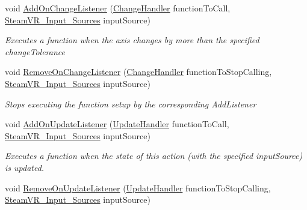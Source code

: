 \begin{DoxyCompactItemize}
void \mbox{\hyperlink{class_valve_1_1_v_r_1_1_steam_v_r___action___vector3_a1a205d38a16267d83ec0e3dcbffa46d7}{Add\+On\+Change\+Listener}} (\mbox{\hyperlink{class_valve_1_1_v_r_1_1_steam_v_r___action___vector3_a78943f89733a1c1a8e12cb4896e65907}{Change\+Handler}} function\+To\+Call, \mbox{\hyperlink{namespace_valve_1_1_v_r_a82e5bf501cc3aa155444ee3f0662853f}{Steam\+V\+R\+\_\+\+Input\+\_\+\+Sources}} input\+Source)
\begin{DoxyCompactList}\small\item\em Executes a function when the axis changes by more than the specified change\+Tolerance \end{DoxyCompactList}\item 
void \mbox{\hyperlink{class_valve_1_1_v_r_1_1_steam_v_r___action___vector3_a2517009b114133b34c81a4713c308985}{Remove\+On\+Change\+Listener}} (\mbox{\hyperlink{class_valve_1_1_v_r_1_1_steam_v_r___action___vector3_a78943f89733a1c1a8e12cb4896e65907}{Change\+Handler}} function\+To\+Stop\+Calling, \mbox{\hyperlink{namespace_valve_1_1_v_r_a82e5bf501cc3aa155444ee3f0662853f}{Steam\+V\+R\+\_\+\+Input\+\_\+\+Sources}} input\+Source)
\begin{DoxyCompactList}\small\item\em Stops executing the function setup by the corresponding Add\+Listener \end{DoxyCompactList}\item 
void \mbox{\hyperlink{class_valve_1_1_v_r_1_1_steam_v_r___action___vector3_a05495244778aff42a6d87709c0aa0d55}{Add\+On\+Update\+Listener}} (\mbox{\hyperlink{class_valve_1_1_v_r_1_1_steam_v_r___action___vector3_a99c0524f104c6d8c94a0e874b0ecc813}{Update\+Handler}} function\+To\+Call, \mbox{\hyperlink{namespace_valve_1_1_v_r_a82e5bf501cc3aa155444ee3f0662853f}{Steam\+V\+R\+\_\+\+Input\+\_\+\+Sources}} input\+Source)
\begin{DoxyCompactList}\small\item\em Executes a function when the state of this action (with the specified input\+Source) is updated. \end{DoxyCompactList}\item 
void \mbox{\hyperlink{class_valve_1_1_v_r_1_1_steam_v_r___action___vector3_af7a0e46c8c8c18fddcce78f9bd31cb3c}{Remove\+On\+Update\+Listener}} (\mbox{\hyperlink{class_valve_1_1_v_r_1_1_steam_v_r___action___vector3_a99c0524f104c6d8c94a0e874b0ecc813}{Update\+Handler}} function\+To\+Stop\+Calling, \mbox{\hyperlink{namespace_valve_1_1_v_r_a82e5bf501cc3aa155444ee3f0662853f}{Steam\+V\+R\+\_\+\+Input\+\_\+\+Sources}} input\+Source)

\end{DoxyCompactItemize}

